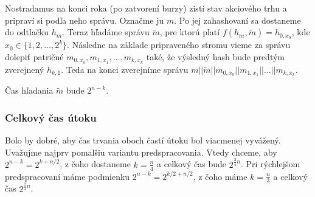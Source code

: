 Nostradamus na konci roka (po zatvorení burzy) zistí stav akciového
trhu a pripraví si podľa neho správu.
Označme ju $m$. Po jej zahashovaní sa dostaneme do odtlačku
$h_m$. Teraz hľadáme správu $\tilde{m}$, pre ktorú platí
$f(h_m, \tilde{m}) = h_{0,x_0}$, kde $x_0 \in \{1, 2, \dots, 2^k\}$.
Následne na základe pripraveného stromu vieme za správu dolepiť patričné 
$m_{0,x_0}, m_{1,x_1}, \dots, m_{k,x_k}$ také, že
výsledný hash bude predtým zverejnený $h_{k,1}$.
Teda na konci zverejníme správu 
$m || \tilde{m} || m_{0,x_0} || m_{1,x_1} || \dots || m_{k, x_k}$.

Čas hľadania $\tilde{m}$ bude $2^{n-k}$.

\subsubsection{Celkový čas útoku}
Bolo by dobré, aby čas trvania oboch častí útoku bol viacmenej vyvážený. 
Uvažujme najprv pomalšiu variantu predspracovania.
Vtedy chceme, aby $2^{n-k} = 2^{k+n/2}$, z čoho dostaneme
$k=\frac{n}{4}$ a celkový čas bude $2^{\frac{3}{4} n}$.
Pri rýchlejšom predspracovaní máme podmienku $2^{n-k} = 2^{k/2 + n/2}$,
z čoho máme $k = \frac{n}{3}$ a celkový čas $2^{\frac{2}{3}n}$.


